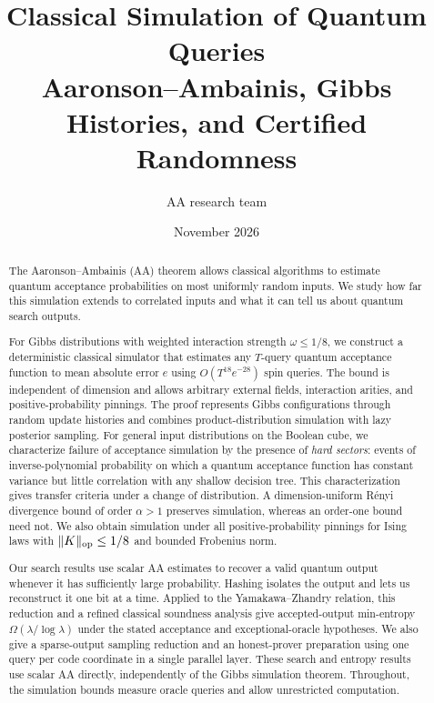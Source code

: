 \documentclass[11pt]{article}
\title{\textbf{Classical Simulation of Quantum Queries}\\[5pt]
{\Large Aaronson--Ambainis, Gibbs Histories, and Certified Randomness}}
\author{AA research team}
\date{November 2026}
\theoremstyle{definition}\newtheorem{definition}[theorem]{Definition}
\theoremstyle{remark}\newtheorem{remark}[theorem]{Remark}
\begin{document}
\maketitle
\thispagestyle{fancy}
\begin{abstract}
\noindent
The Aaronson--Ambainis (AA) theorem allows classical algorithms to estimate quantum acceptance probabilities on most uniformly random inputs. We study how far this simulation extends to correlated inputs and what it can tell us about quantum search outputs.

For Gibbs distributions with weighted interaction strength $\omega\leq1/8$, we construct a deterministic classical simulator that estimates any $T$-query quantum acceptance function to mean absolute error $e$ using $O(T^{18}e^{-28})$ spin queries. The bound is independent of dimension and allows arbitrary external fields, interaction arities, and positive-probability pinnings. The proof represents Gibbs configurations through random update histories and combines product-distribution simulation with lazy posterior sampling. For general input distributions on the Boolean cube, we characterize failure of acceptance simulation by the presence of \emph{hard sectors}: events of inverse-polynomial probability on which a quantum acceptance function has constant variance but little correlation with any shallow decision tree. This characterization gives transfer criteria under a change of distribution. A dimension-uniform R\'enyi divergence bound of order $\alpha>1$ preserves simulation, whereas an order-one bound need not. We also obtain simulation under all positive-probability pinnings for Ising laws with $\|K\|_{\rm op}\leq1/8$ and bounded Frobenius norm.

Our search results use scalar AA estimates to recover a valid quantum output whenever it has sufficiently large probability. Hashing isolates the output and lets us reconstruct it one bit at a time. Applied to the Yamakawa--Zhandry relation, this reduction and a refined classical soundness analysis give accepted-output min-entropy $\Omega(\lambda/\log\lambda)$ under the stated acceptance and exceptional-oracle hypotheses. We also give a sparse-output sampling reduction and an honest-prover preparation using one query per code coordinate in a single parallel layer. These search and entropy results use scalar AA directly, independently of the Gibbs simulation theorem. Throughout, the simulation bounds measure oracle queries and allow unrestricted computation.
\end{abstract}
\tableofcontents
\clearpage
\end{document}
